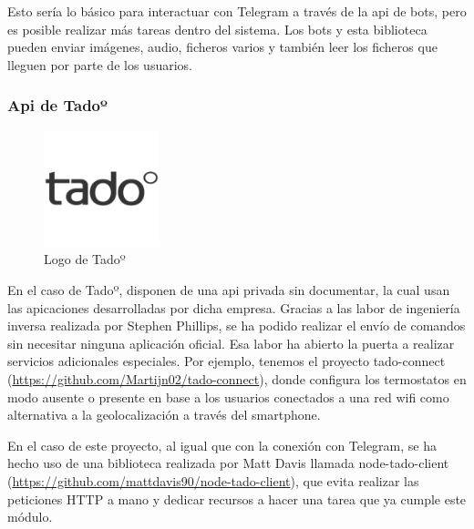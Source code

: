\documentclass[spanish,12pt, a4paper, twoside]{paper}
\begin{document}
Esto sería lo básico para interactuar con Telegram a través de la api de bots, pero es posible realizar más tareas dentro del sistema. Los bots y esta biblioteca pueden enviar imágenes, audio, ficheros varios y también leer los ficheros que lleguen por parte de los usuarios.
\newpage

\subsubsection{Api de Tadoº}

\begin{figure}
\centering
	\includegraphics[width=0.30\textwidth]{recursos/tadologo}
\caption{Logo de Tadoº}
\label{fig:Logo de Tadoº}
\end{figure}

En el caso de Tadoº, disponen de una api privada sin documentar, la cual usan las apicaciones desarrolladas por dicha empresa. Gracias a las labor de ingeniería inversa realizada por Stephen Phillips, se ha podido realizar el envío de comandos sin necesitar ninguna aplicación oficial. Esa labor ha abierto la puerta a realizar servicios adicionales especiales.
Por ejemplo, tenemos el proyecto tado-connect (\url{https://github.com/Martijn02/tado-connect}), donde configura los termostatos en modo ausente o presente en base a los usuarios conectados a una red wifi como alternativa a la geolocalización a través del smartphone.
\newline

En el caso de este proyecto, al igual que con la conexión con Telegram, se ha hecho uso de una biblioteca realizada por Matt Davis llamada node-tado-client (\url{https://github.com/mattdavis90/node-tado-client}), que evita realizar las peticiones HTTP a mano y dedicar recursos a hacer una tarea que ya cumple este módulo.
\newline
\end{document}
